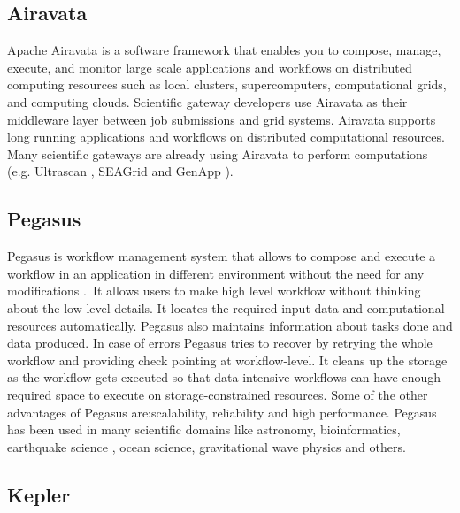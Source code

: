 \subsection{Airavata}

   Apache Airavata \cite{www-airavata} is a software framework that
   enables you to compose, manage, execute, and monitor large scale
   applications and workflows on distributed computing resources such
   as local clusters, supercomputers, computational grids, and
   computing clouds. Scientific gateway developers use Airavata as
   their middleware layer between job submissions and grid
   systems. Airavata supports long running applications and workflows
   on distributed computational resources. Many scientific gateways
   are already using Airavata to perform computations (e.g. Ultrascan
   \cite{www-ultrascan}, SEAGrid \cite{www-seagrid} and GenApp
   \cite{www-genapp}).

   \pv

\subsection{Pegasus}\label{S:pegasus}

   Pegasus is workflow management system
   that allows to compose and execute a workflow in an application
   in different environment without the need  for any 
   modifications \cite{www-Pegasus}. It allows users to make high level workflow
   without thinking about the low level details. It locates
   the required input data and computational resources automatically. 
   Pegasus also maintains information about tasks done and data 
   produced. In case of errors Pegasus tries to recover by retrying 
   the whole workflow and providing check pointing at workflow-level. 
   It cleans up the storage as the workflow gets executed so that 
   data-intensive workflows can have enough required space to execute 
   on storage-constrained resources. Some of the other advantages of 
   Pegasus are:scalability, reliability and high performance. Pegasus 
   has been used in many scientific domains like astronomy, 
   bioinformatics, earthquake science , ocean science, gravitational 
   wave physics and others.

   \pv


\subsection{Kepler}
 
